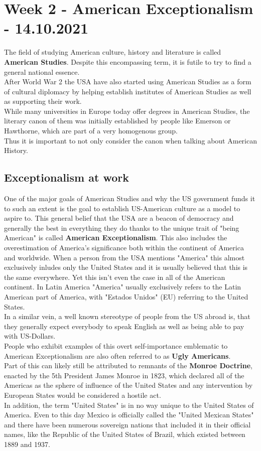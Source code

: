 \documentclass{article}
\begin{document}
	\section{Week 2 - American Exceptionalism - 14.10.2021}

	The field of studying American culture, history and literature is called \textbf{American Studies}. Despite this encompassing term, it is futile to try to find a general national essence. \\
	After World War 2 the USA have also started using American Studies as a form of cultural diplomacy by helping establish institutes of American Studies as well as supporting their work. \\
	While many universities in Europe today offer degrees in American Studies, the literary canon of them was initially established by people like Emerson or Hawthorne, which are part of a very homogenous group. \\
	Thus it is important to not only consider the canon when talking about American History. \\
	\subsection{Exceptionalism at work}
	One of the major goals of American Studies and why the US government funds it to such an extent is the goal to establish US-American culture as a model to aspire to. This general belief that the USA are a beacon of democracy and generally the best in everything they do thanks to the unique trait of "being American" is called \textbf{American Exceptionalism}. This also includes the overestimation of America's significance both within the continent of America and worldwide. When a person from the USA mentions "America" this almost exclusively inludes only the United States and it is usually believed that this is the same everywhere. Yet this isn't even the case in all of the American continent. In Latin America "America" usually exclusively refers to the Latin American part of America, with "Estados Unidos" (EU) referring to the United States. \\
	In a similar vein, a well known stereotype of people from  the US abroad is, that they generally expect everybody to speak English as well as being able to pay with US-Dollars. \\
	People who exhibit examples of this overt self-importance emblematic to American Exceptionalism are also often referred to as \textbf{Ugly Americans}. \\
	Part of this can likely still be attributed to remnants of the \textbf{Monroe Doctrine}, enacted by the 5th President James Monroe in 1823, which declared all of the Americas as the sphere of influence of the United States and any intervention by European States would be considered a hostile act. \\
	In addition, the term "United States" is in no way unique to the United States of America. Even to this day Mexico is officially called the "United Mexican States" and there have been numerous sovereign nations that included it in their official names, like the Republic of the United States of Brazil, which existed between 1889 and 1937. \\
\end{document}
